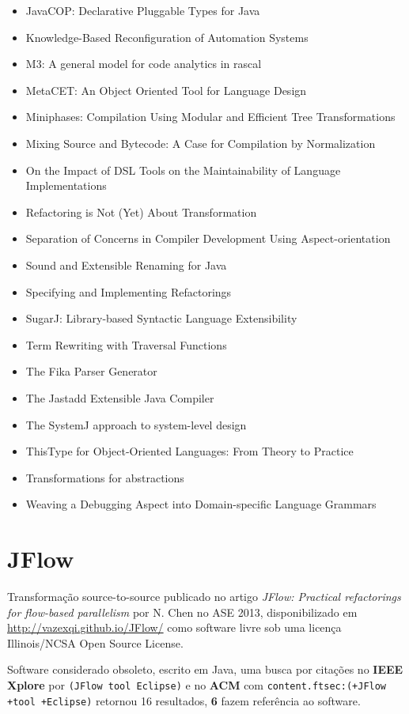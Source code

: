 \begin{itemize}
\item JavaCOP: Declarative Pluggable Types for Java
\item Knowledge-Based Reconfiguration of Automation Systems
\item M3: A general model for code analytics in rascal
\item MetaCET: An Object Oriented Tool for Language Design
\item Miniphases: Compilation Using Modular and Efficient Tree Transformations
\item Mixing Source and Bytecode: A Case for Compilation by Normalization
\item On the Impact of DSL Tools on the Maintainability of Language Implementations
\item Refactoring is Not (Yet) About Transformation
\item Separation of Concerns in Compiler Development Using Aspect-orientation
\item Sound and Extensible Renaming for Java
\item Specifying and Implementing Refactorings
\item SugarJ: Library-based Syntactic Language Extensibility
\item Term Rewriting with Traversal Functions
\item The Fika Parser Generator
\item The Jastadd Extensible Java Compiler
\item The SystemJ approach to system-level design
\item ThisType for Object-Oriented Languages: From Theory to Practice
\item Transformations for abstractions
\item Weaving a Debugging Aspect into Domain-specific Language Grammars
\end{itemize}


\section{JFlow}

Transformação source-to-source
publicado no artigo {\it JFlow: Practical refactorings for flow-based parallelism}
por N. Chen
no ASE 2013,
disponibilizado em \url{http://vazexqi.github.io/JFlow/}
como software livre
sob uma licença Illinois/NCSA Open Source License.

Software considerado obsoleto,
escrito em Java,
uma busca por citações no {\bf IEEE Xplore} por
\texttt{(JFlow tool Eclipse)}
e no {\bf ACM} com
\texttt{content.ftsec:(+JFlow +tool +Eclipse)}
retornou
16 resultados,
{\bf 6} fazem referência ao software.

